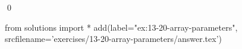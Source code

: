 
\begin{ex}
  \label{ex:13-20-array-parameters}
  
  \qed
\end{ex}
\begin{python0}
from solutions import *
add(label="ex:13-20-array-parameters",
    srcfilename='exercises/13-20-array-parameters/answer.tex')
\end{python0}
